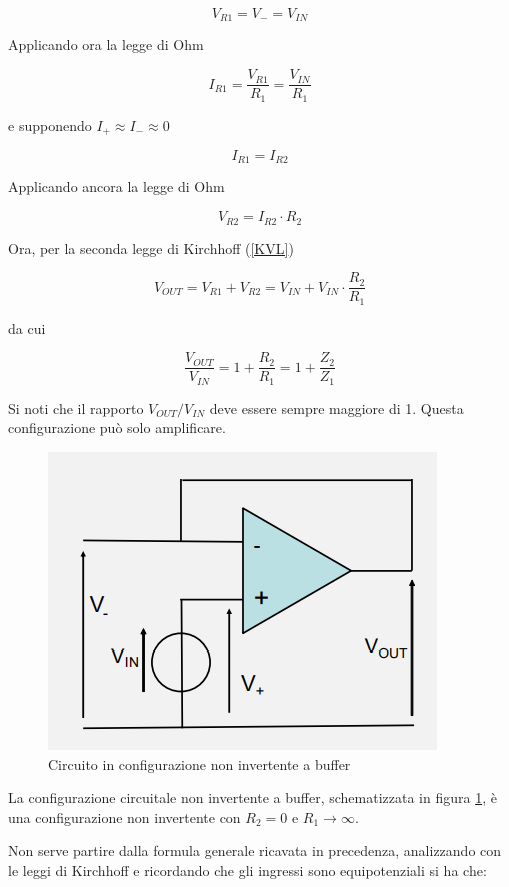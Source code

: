 \documentclass{article}
\begin{document}
\[V_{R1} = V_- = V_{IN}\]

Applicando ora la legge di Ohm

\[I_{R1} = \frac{V_{R1}}{R_1} = \frac{V_{IN}}{R_1}\]

e supponendo $I_{+} \approx I_{-} \approx 0$

\[I_{R1} = I_{R2}\]

Applicando ancora la legge di Ohm

\[V_{R2} = I_{R2} \cdot R_2\]

Ora, per la seconda legge di Kirchhoff (\ref{KVL})

\[V_{OUT} = V_{R1} + V_{R2} = V_{IN} + V_{IN} \cdot \frac{R_2}{R_1}\]

da cui 

\[\frac{V_{OUT}}{V_{IN}} = 1 + \frac{R_2}{R_1} = 1 + \frac{Z_2}{Z_1}\]

Si noti che il rapporto $V_{OUT}/V_{IN}$ deve essere sempre maggiore di 1. Questa configurazione può solo amplificare.

\clearpage
\begin{figure}[h]
  \centering
  \includegraphics[scale=0.7]{IM_circuito_non_invertente_buffer}
  \caption{Circuito in configurazione non invertente a buffer}
  \label{Schema_circuito_non_invertente_buffer}
\end{figure}

La configurazione circuitale non invertente a buffer, schematizzata in figura \ref{Schema_circuito_non_invertente_buffer}, è una configurazione non invertente con $R_2 = 0$ e $R_1 \rightarrow \infty$.

\vspace{1mm}

Non serve partire dalla formula generale ricavata in precedenza, analizzando con le leggi di Kirchhoff e ricordando che gli ingressi sono equipotenziali si ha che:
\end{document}
